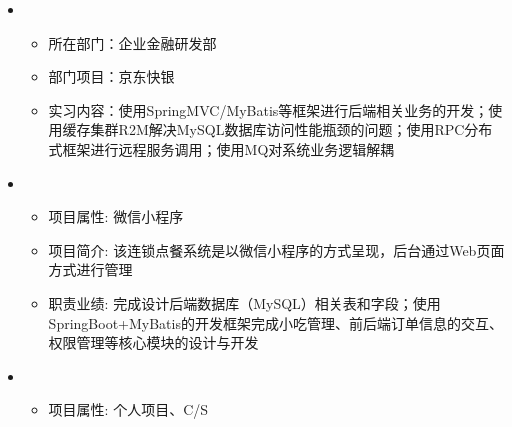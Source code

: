   \begin{itemize}[leftmargin=*]
    \item 
        {\small
      \begin{itemize}
        \item 所在部门：企业金融研发部
        \item 部门项目：京东快银
        \item 实习内容：使用SpringMVC/MyBatis等框架进行后端相关业务的开发；使用缓存集群R2M解决MySQL数据库访问性能瓶颈的问题；使用RPC分布式框架进行远程服务调用；使用MQ对系统业务逻辑解耦
      \end{itemize}
      }
    \item
      {\small
      \begin{itemize}
        \item 项目属性: 微信小程序
        \item 项目简介: 该连锁点餐系统是以微信小程序的方式呈现，后台通过Web页面方式进行管理
        \item 职责业绩: 完成设计后端数据库（MySQL）相关表和字段；使用SpringBoot+MyBatis的开发框架完成小吃管理、前后端订单信息的交互、权限管理等核心模块的设计与开发
      \end{itemize}
      }
    \item
      {\small
      \begin{itemize}
        \item 项目属性: 个人项目、C/S

\end{itemize}}
\end{itemize}
